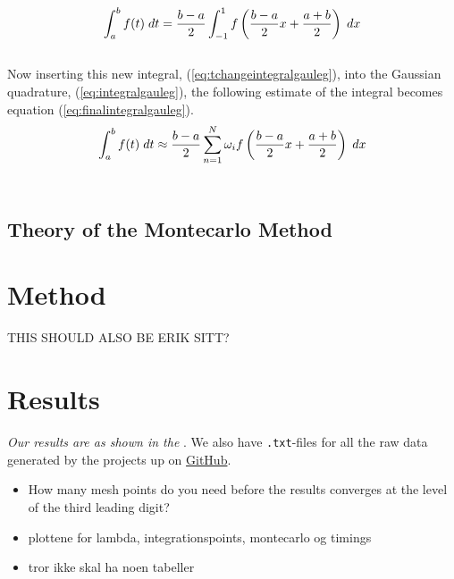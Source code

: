 \documentclass{article}
\begin{document}
\begin{equation} \label{eq:tchangeintegralgauleg}
    \int_{a}^{b} f(t) \hspace{1mm} dt = \frac{b-a}{2}\int_{-1}^{1} f \left( \frac{b-a}{2}x + \frac{a+b}{2} \right) \hspace{1mm} dx
\end{equation} \\

Now inserting this new integral, (\ref{eq:tchangeintegralgauleg}), into the Gaussian quadrature, (\ref{eq:integralgauleg}), the following estimate of the integral becomes equation (\ref{eq:finalintegralgauleg}). \\

\begin{equation} \label{eq:finalintegralgauleg}
    \int_{a}^{b} f(t) \hspace{1mm} dt \approx \frac{b-a}{2} \sum_{n=1}^{N} \omega_i f \left( \frac{b-a}{2}x + \frac{a+b}{2} \right) \hspace{1mm} dx
\end{equation} \\

\subsection{Theory of the Montecarlo Method}


\vspace{1cm}

\section{Method} \label{sec:Method}


THIS SHOULD ALSO BE ERIK SITT?

\vspace{1cm}

\section{Results} \label{sec:Results}

  \textit{Our results are as shown in the }. We also have \texttt{.txt}-files for all the raw data generated by the projects up on \href{https://github.com/Erikbgram/Fys3150}{GitHub}. \\

\begin{itemize}

  \item How many mesh points do you need before the results converges at the level of the third leading digit?

  \item plottene for lambda, integrationspoints, montecarlo og timings

  \item tror ikke skal ha noen tabeller

\end{itemize}
\end{document}
